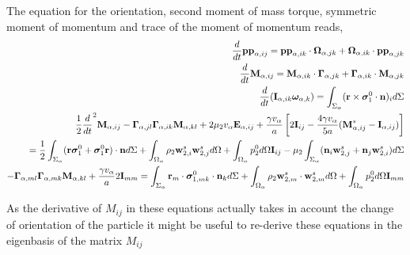 The equation for the orientation, second moment of mass torque, symmetric moment of momentum and trace of the moment of momentum reads, 
\begin{align*}
    \frac{d}{d t} \textbf{pp}_{\alpha,ij}
    = \textbf{pp}_{\alpha,ik} \cdot \bm\Omega_{\alpha,jk}
    +  \bm\Omega_{\alpha,ik} \cdot \textbf{pp}_{\alpha,jk}\\
    \frac{d}{d t} \textbf{M}_{\alpha,ij}
    = \textbf{M}_{\alpha,ik} \cdot \bm\Gamma_{\alpha,jk}
    +  \bm\Gamma_{\alpha,ik} \cdot \textbf{M}_{\alpha,jk}\\
    \frac{d}{d t} (\textbf{I}_{\alpha,ik}\bm\omega_{\alpha,k} )
    = 
    \int_{\Sigma_\alpha} (\textbf{r}\times\bm\sigma_1^0\cdot \textbf{n})_i d\Sigma \\
    \frac{1}{2}\frac{d}{d t}^2 \textbf{M}_{\alpha,ij}
    -  \bm\Gamma_{\alpha,jl}\bm\Gamma_{\alpha,ik} \textbf{M}_{\alpha,kl}  
    + 2 \mu_2 v_\alpha \textbf{E}_{\alpha,ij}
    + \frac{\gamma v_\alpha }{a} \left[
    2\textbf{I}_{ij} 
    - \frac{4 \gamma v_\alpha }{5 a} (\textbf{M}_{\alpha,ij}^* - \textbf{I}_{\alpha,ij})
    \right]\\
    = 
    \frac{1}{2}\int_{\Sigma_\alpha} (\textbf{r}\bm\sigma_1^0 + \bm\sigma_1^0\textbf{r})\cdot \textbf{n} d\Sigma 
    + \int_{\Omega_\alpha} \rho_2 \textbf{w}_{2,i}^s\textbf{w}_{2,j}^s d\Omega
    + \int_{\Omega_\alpha} p_2^0 d\Omega \textbf{I}_{ij}
    - \mu_2 \int_{\Sigma_\alpha} (\textbf{n}_i \textbf{w}_{2,j}^s + \textbf{n}_j \textbf{w}_{2,i}^s) d\Sigma\\
    -  \bm\Gamma_{\alpha,ml}\bm\Gamma_{\alpha,mk} \textbf{M}_{\alpha,kl}  
    + \frac{\gamma v_\alpha }{a} 
    2\textbf{I}_{mm} 
    = 
    \int_{\Sigma_\alpha} \textbf{r}_m\cdot\bm\sigma_{1,mk}^0\cdot \textbf{n}_k d\Sigma 
    + \int_{\Omega_\alpha} \rho_2 \textbf{w}_{2,m}^s\cdot \textbf{w}_{2,m}^s d\Omega
    + \int_{\Omega_\alpha} p_2^0 d\Omega \textbf{I}_{mm}
\end{align*}

As the derivative of $M_{ij}$ in these equations actually takes in account the change of orientation of the particle it might be useful to re-derive these equations in the eigenbasis of the matrix $M_{ij}$

